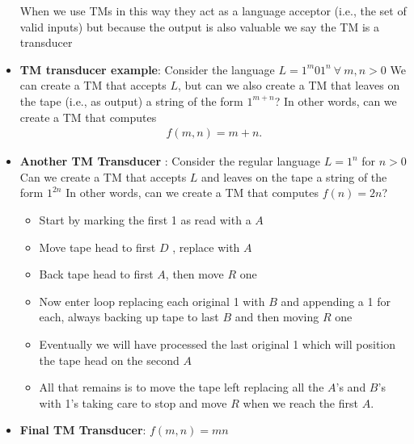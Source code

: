 \documentclass{report}
\begin{document}
\begin{itemize}
            When we use TMs in this way they act as a language acceptor (i.e., the set of valid inputs) but because the output is also valuable we say the TM is a transducer
        \item \textbf{TM transducer example}: Consider the language $L = 1^{m}01^{n} \ \forall \ m,n > 0 $
            \bigbreak \noindent 
            We can create a TM that accepts $L$, but can we also create a TM that leaves on the tape (i.e., as output) a string of the form $1^{m+n}$?
            \bigbreak \noindent 
            In other words, can we create a TM that computes
            \begin{align*}
                f(m,n) = m + n
            .\end{align*}
            \pagebreak \bigbreak \noindent 
            \begin{figure}[ht]
                \centering
                \label{fig:t5}
            \end{figure}
        \item \textbf{Another TM Transducer }: Consider the regular language $L = 1^{n}$ for $n > 0$
            \bigbreak \noindent 
            Can we create a TM that accepts $L$ and leaves on the tape a string of the form $1^{2n} $
            \bigbreak \noindent 
            In other words, can we create a TM that computes $f(n) = 2n$?
            \begin{itemize}
                \item Start by marking the first 1 as read with a $A$
                \item Move tape head to first $D$ , replace with $A$
                \item Back tape head to first $A$, then move $R$ one
                \item Now enter loop replacing each original 1 with $B$ and appending a 1 for each, always backing up tape to last $B$ and then moving $R$ one
                \item Eventually we will have processed the last original 1 which will position the tape head on the second $A$
                \item All that remains is to move the tape left replacing all the $A $'s and $B$'s with 1's taking care to stop and move $R$ when we reach the first $A$.
            \end{itemize}
            \bigbreak \noindent 
        \item \textbf{Final TM Transducer}: $f(m,n) = mn$

\end{itemize}
\end{document}
